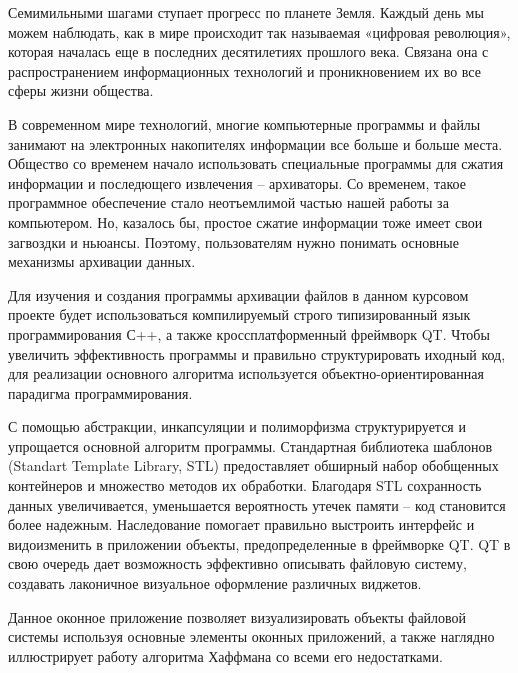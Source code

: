 \label{sec:intro}

Семимильными шагами ступает прогресс по планете Земля. Каждый день мы можем наблюдать,
как в мире происходит так называемая «цифровая революция», которая
началась еще в последних десятилетиях прошлого века. Связана она с распространением
информационных технологий и проникновением их во все сферы жизни общества.



В современном мире технологий, многие компьютерные программы и файлы занимают на электронных накопителях информации все больше и больше места. 
Общество со временем начало использовать специальные программы для сжатия информации и последющего извлечения -- архиваторы. 
Со временем, такое программное обеспечение стало неотъемлимой частью нашей работы за компьютером. 
Но, казалось бы, простое сжатие информации тоже имеет свои загвоздки и ньюансы.
Поэтому, пользователям нужно понимать основные механизмы архивации данных.



Для изучения и создания программы архивации файлов в данном курсовом проекте будет использоваться компилируемый строго типизированный язык программирования С++, а также кроссплатформенный фреймворк QT.
Чтобы увеличить эффективность программы и правильно структурировать иходный код, для реализации основного алгоритма используется объектно-ориентированная парадигма программирования.


С помощью абстракции, инкапсуляции и полиморфизма структурируется и упрощается основной алгоритм программы. 
Стандартная библиотека шаблонов (Standart Template Library, STL) предоставляет обширный набор обобщенных контейнеров и множество методов их обработки. 
Благодаря STL сохранность данных увеличивается, уменьшается вероятность утечек памяти -- код становится более надежным.
Наследование помогает правильно выстроить интерфейс и видоизменить в приложении объекты, предопределенные в фреймворке QT. 
QT в свою очередь дает возможность эффективно описывать файловую систему, создавать лаконичное визуальное оформление различных виджетов.



Данное оконное приложение позволяет визуализировать объекты файловой системы используя основные элементы оконных приложений, а также наглядно иллюстрирует работу алгоритма Хаффмана со всеми его недостатками. 